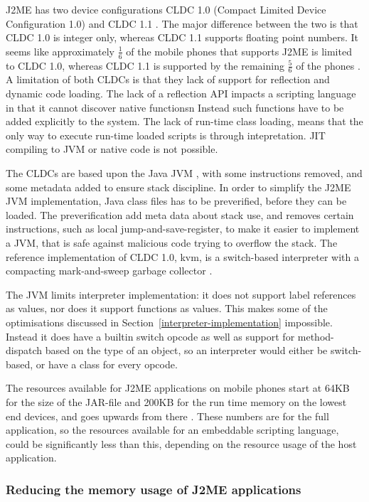 \documentclass[11pt]{report}
\begin{document}
J2ME has two device configurations CLDC 1.0 (Compact Limited Device Configuration 1.0) \cite{cldc10}  and CLDC 1.1  \cite{cldc11}. The major difference between the two is that CLDC 1.0 is integer only, whereas CLDC 1.1 supports floating point numbers.
It seems like approximately $\frac{1}{6}$ of the mobile phones that supports J2ME is limited to CLDC 1.0, whereas CLDC 1.1 is supported by the remaining $\frac{5}{6}$ of the phones \cite{mobref}.
A limitation of both CLDCs is that they lack of support for reflection and dynamic code loading.
The lack of a reflection API impacts a scripting language in that it cannot discover native functionsn Instead such functions have to be added explicitly to the system.
The lack of run-time class loading, means that the only way to execute run-time loaded scripts is through intepretation. JIT compiling to JVM or native code is not possible.

The CLDCs are based upon the Java JVM \cite{jvmref}, with some instructions removed, and some metadata added to ensure stack discipline. 
In order to simplify the J2ME JVM implementation, Java class files has to be preverified, before they can be loaded.
The preverification add meta data about stack use, and removes certain instructions, such as local jump-and-save-register, to make it easier to implement a JVM, that is safe against malicious code trying to overflow the stack.
The reference implementation of CLDC 1.0, kvm, is a switch-based interpreter with a compacting mark-and-sweep garbage collector \cite{kvm}.


The JVM limits interpreter implementation: it does not support label references as values, nor does it support functions as values. This makes some of the optimisations discussed in 
Section~\ref{interpreter-implementation} impossible.
Instead it does have a builtin switch opcode as well as support for method-dispatch based on the type of an object, so an interpreter would either be switch-based, or have a class for every opcode.

The resources available for J2ME applications on mobile phones start at 64KB for the size of the JAR-file and 200KB for the run time memory on the lowest end devices, and goes upwards from there \cite{nokia-optim}.
These numbers are for the full application, so the resources available for an embeddable scripting language, could be significantly less than this, depending on the resource usage of the host application.

\subsubsection{Reducing the memory usage of J2ME applications}
\end{document}
